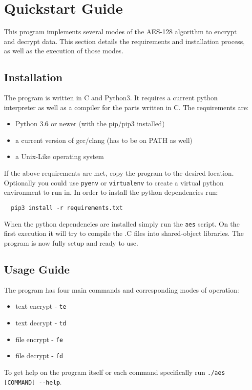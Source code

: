 \section{Quickstart Guide}

This program implements several modes of the AES-128 algorithm to encrypt and decrypt data. This section details the requirements and installation process, as well as the execution of those modes.

\subsection{Installation}

The program is written in C and Python3. It requires a current python interpreter as well as a compiler for the parts written in C. The requirements are:
\begin{itemize}
  \item Python 3.6 or newer (with the pip/pip3 installed)
  \item a current version of gcc/clang (has to be on PATH as well)
  \item a Unix-Like operating system
\end{itemize}

If the above requirements are met, copy the program to the desired location. Optionally you could use \lstinline{pyenv} or \lstinline{virtualenv} to create a virtual python environment to run in. In order to install the python dependencies run:
\begin{lstlisting}
  pip3 install -r requirements.txt
\end{lstlisting}

When the python dependencies are installed simply run the \lstinline{aes} script. On the first execution it will try to compile the .C files into shared-object libraries. The program is now fully setup and ready to use.

\subsection{Usage Guide}
The program has four main commands and corresponding modes of operation:
\begin{itemize}
  \item text encrypt -  \lstinline{te}
  \item text decrypt -  \lstinline{td}
  \item file encrypt -  \lstinline{fe}
  \item file decrypt -  \lstinline{fd}
\end{itemize}
To get help on the program itself or each command specifically run \lstinline{./aes [COMMAND] --help}.

